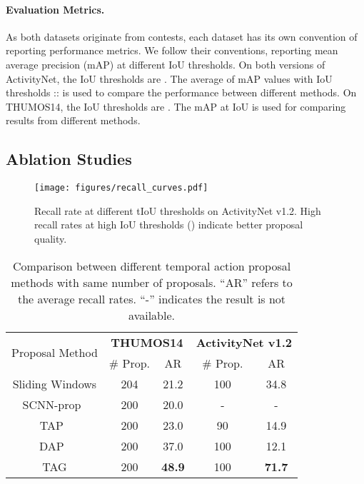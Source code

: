 \documentclass[10pt,twocolumn,letterpaper]{article}
\begin{document}
\vspace{-12pt}
\paragraph{Evaluation Metrics.}
As both datasets originate from contests,
each dataset has its own convention of reporting performance metrics.
We follow their conventions, reporting mean average precision (mAP) at different IoU thresholds.
On both versions of ActivityNet, the IoU thresholds are .
The average of mAP values with IoU thresholds :: is used to compare the performance between different methods.
On THUMOS14, the IoU thresholds are .
The mAP at  IoU is used for comparing results from different methods.


\subsection{Ablation Studies}

\begin{figure}[t]
	\begin{center}
		\texttt{[image: figures/recall\_curves.pdf]}
	\end{center}
	\caption{\small
		Recall rate at different tIoU thresholds on ActivityNet v1.2.
		High recall rates at high IoU  thresholds () indicate better proposal quality.}
	\label{fig:recall_iou}
\vspace{-5pt}
\end{figure}

\begin{table}[t]
\begin{center}
		\begin{tabular}{c|c|c|c|c}
			\hline
			\multirow{2}{*}{Proposal Method}& \multicolumn{2}{|c|}{\textbf{THUMOS14}}  & \multicolumn{2}{|c}{\textbf{ActivityNet v1.2}} \\
			\cline{2-5}
			& \# Prop. & AR & \# Prop. & AR \\
			\hline
			Sliding Windows&  204  & 21.2 & 100 & 34.8\\
			\hline
			SCNN-prop~\cite{Shou2016SCNN} & 200 & 20.0 & - & - \\
			\hline
			TAP~\cite{caba2016cvpr}& 200  & 23.0  & 90  & 14.9 \\
			\hline
			DAP~\cite{Escorcia2016DAP}& 200 & 37.0 &100 & 12.1  \\ 
			\hline\hline
			TAG & 200 & {\bf 48.9} & 100 & {\bf 71.7} \\
			\hline
		\end{tabular}
\end{center}
\caption{\small
	Comparison between different temporal action proposal methods with same number of proposals.
	``AR'' refers to the average recall rates.
	``-'' indicates the result is not available.}
\label{table:proposals}
\vspace{-12pt}
\end{table}
\end{document}

